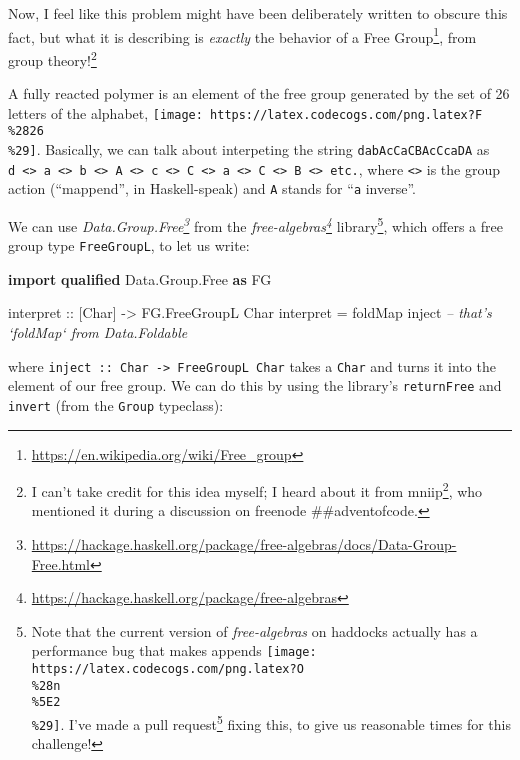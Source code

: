 \documentclass[]{article}
\newenvironment{Shaded}{}{}
\newcommand{\CommentTok}[1]{\textcolor[rgb]{0.38,0.63,0.69}{\textit{#1}}}
\newcommand{\DataTypeTok}[1]{\textcolor[rgb]{0.56,0.13,0.00}{#1}}
\newcommand{\FunctionTok}[1]{\textcolor[rgb]{0.02,0.16,0.49}{#1}}
\newcommand{\KeywordTok}[1]{\textcolor[rgb]{0.00,0.44,0.13}{\textbf{#1}}}
\newcommand{\NormalTok}[1]{#1}
\newcommand{\OtherTok}[1]{\textcolor[rgb]{0.00,0.44,0.13}{#1}}
\renewcommand{\href}[2]{#2\footnote{\url{#1}}}
\begin{document}
Now, I feel like this problem might have been deliberately written to obscure
this fact, but what it is describing is \emph{exactly} the behavior of a
\href{https://en.wikipedia.org/wiki/Free_group}{Free Group}, from group
theory!\footnote{I can't take credit for this idea myself; I heard about it from
  \href{http://mniip.com/}{mniip}, who mentioned it during a discussion on
  freenode \#\#adventofcode.}

A fully reacted polymer is an element of the free group generated by the set of
26 letters of the alphabet,
\texttt{[image: https://latex.codecogs.com/png.latex?F\\\%2826\\\%29]}. Basically,
we can talk about interpeting the string \texttt{dabAcCaCBAcCcaDA} as
\texttt{d\ \textless{}\textgreater{}\ a\ \textless{}\textgreater{}\ b\ \textless{}\textgreater{}\ A\ \textless{}\textgreater{}\ c\ \textless{}\textgreater{}\ C\ \textless{}\textgreater{}\ a\ \textless{}\textgreater{}\ C\ \textless{}\textgreater{}\ B\ \textless{}\textgreater{}\ etc.},
where \texttt{\textless{}\textgreater{}} is the group action (``mappend'', in
Haskell-speak) and \texttt{A} stands for ``\texttt{a} inverse''.

We can use
\emph{\href{https://hackage.haskell.org/package/free-algebras/docs/Data-Group-Free.html}{Data.Group.Free}}
from the
\emph{\href{https://hackage.haskell.org/package/free-algebras}{free-algebras}}
library\footnote{Note that the current version of \emph{free-algebras} on
  haddocks actually has a performance bug that makes appends
  \texttt{[image: https://latex.codecogs.com/png.latex?O\\\%28n\\\%5E2\\\%29]}. I've
  made a \href{https://github.com/coot/free-algebras/pull/4}{pull request}
  fixing this, to give us reasonable times for this challenge!}, which offers a
free group type \texttt{FreeGroupL}, to let us write:

\begin{Shaded}
\begin{Highlighting}[]
\KeywordTok{import} \KeywordTok{qualified} \DataTypeTok{Data.Group.Free} \KeywordTok{as} \DataTypeTok{FG}

\OtherTok{interpret ::}\NormalTok{ [}\DataTypeTok{Char}\NormalTok{] }\OtherTok{->} \DataTypeTok{FG.FreeGroupL} \DataTypeTok{Char}
\NormalTok{interpret }\FunctionTok{=}\NormalTok{ foldMap inject          }\CommentTok{-- that's `foldMap` from Data.Foldable}
\end{Highlighting}
\end{Shaded}

where \texttt{inject\ ::\ Char\ -\textgreater{}\ FreeGroupL\ Char} takes a
\texttt{Char} and turns it into the element of our free group. We can do this by
using the library's \texttt{returnFree} and \texttt{invert} (from the
\texttt{Group} typeclass):
\end{document}
